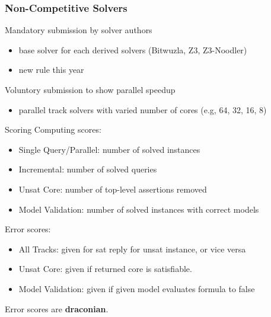 \documentclass[table]{beamer}
\def\emph#1{\textcolor{MYblue}{#1}}
\begin{document}
\begin{frame}
  \frametitle{Non-Competitive Solvers}

  Mandatory submission by solver authors
  \begin{itemize}
  \item base solver for each \emph{derived} solvers (Bitwuzla, Z3, Z3-Noodler)
  \item new rule this year
  \end{itemize}

  \bigskip

  Voluntory submission to show parallel speedup
  \begin{itemize}
  \item parallel track solvers with varied number of cores (e.g, 64, 32, 16, 8)
  \end{itemize}

  \bigskip

\end{frame}

\begin{frame}{Scoring}
  Computing scores:
  \begin{itemize}
  \item \emph{Single Query/Parallel}: number of solved \emph{instances}
  \item \emph{Incremental}: number of solved \emph{queries}
  \item \emph{Unsat Core}: number of top-level assertions \emph{removed}
  \item \emph{Model Validation}: number of solved instances with correct \emph{models}
  \end{itemize}

  \bigskip
  Error scores:
  \begin{itemize}
  \item \emph{All Tracks}: given for sat reply for unsat instance, or vice versa
  \item \emph{Unsat Core}: given if returned core is satisfiable.
  \item \emph{Model Validation}: given if given model evaluates formula to \emph{false}
  \end{itemize}
  Error scores are \textbf{draconian}.
\end{frame}
\end{document}
